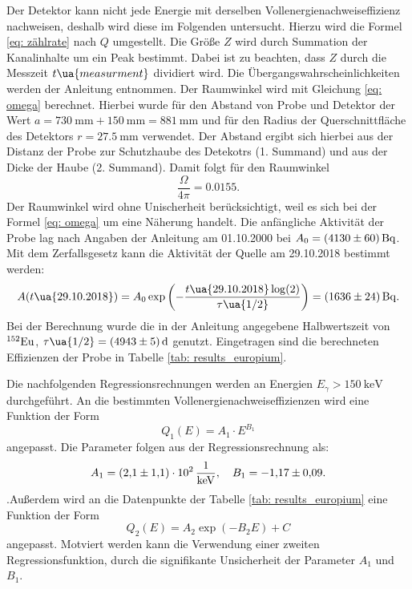\FloatBarrier
Der Detektor kann nicht jede Energie mit derselben Vollenergienachweiseffizienz
nachweisen, deshalb wird diese im Folgenden untersucht. Hierzu wird die Formel
\eqref{eq: zählrate} nach $Q$ umgestellt. Die Größe $Z$ wird durch Summation der Kanalinhalte
um ein Peak bestimmt. Dabei ist zu beachten, dass $Z$ durch die Messzeit $t\ua{measurment}$
dividiert wird. Die Übergangswahrscheinlichkeiten werden der Anleitung \cite{anleitungv18}
entnommen. Der Raumwinkel wird mit Gleichung \eqref{eq: omega} berechnet. Hierbei wurde
für den Abstand von Probe und Detektor der Wert $a=\SI{730}{\milli\meter}+\SI{150}{\milli\meter}=\SI{881}{\milli\meter}$ und für
den Radius der Querschnittfläche des Detektors $r=\SI{27.5}{\milli\meter}$
verwendet. Der Abstand ergibt sich hierbei aus der Distanz der Probe zur
Schutzhaube des Detekotrs (1. Summand) und aus der Dicke der Haube (2. Summand).
Damit folgt für den Raumwinkel
\begin{equation}
  \label{eq:winkelverteilung}
  \frac{\Omega}{4\pi}=\num{0.0155}.
\end{equation}
Der Raumwinkel wird ohne Unischerheit berücksichtigt, weil es sich bei der Formel
\eqref{eq: omega} um eine Näherung handelt.
Die anfängliche Aktivität der Probe lag nach Angaben der Anleitung \cite{anleitungv18}
am 01.10.2000 bei $A_0=\SI{4130\pm60}{\becquerel}$. Mit dem Zerfallsgesetz kann die
Aktivität der Quelle am 29.10.2018 bestimmt werden:
\begin{equation}
  A(t\ua{29.10.2018})=A_0\exp\left(-\frac{t\ua{29.10.2018}\log(2)}{\tau\ua{1/2}}\right) = \SI{1636\pm24}{\becquerel}.
\end{equation}
Bei der Berechnung wurde die in der Anleitung \cite{anleitungv18} angegebene
Halbwertszeit von $^{152}\ce{Eu}$, $\tau\ua{1/2}=\SI{4943 \pm 5 }{\day}$ genutzt.
Eingetragen sind die berechneten Effizienzen der Probe in Tabelle \ref{tab: results_europium}.

Die nachfolgenden Regressionsrechnungen werden an Energien $E_\gamma>\SI{150}{\kilo\eV}$
durchgeführt.
An die bestimmten Vollenergienachweiseffizienzen wird eine Funktion der Form
\begin{equation*}
  Q_1(E)=A_1\cdot E^{B_1}
\end{equation*}
angepasst. Die Parameter folgen aus der Regressionsrechnung als:
\begin{equation}
\label{eq:effizienz_Q_1}
A_1 = \SI{2.1\pm1.1 e2}{\per\kilo\eV}, \quad B_1=\num{-1.17\pm 0.09}.
\end{equation}
.Außerdem wird an die Datenpunkte der Tabelle \ref{tab: results_europium}
eine Funktion der Form
\begin{equation*}
  Q_2(E)=A_2\exp\left(-B_2 E\right)+C
\end{equation*}
angepasst. Motviert werden kann die Verwendung einer zweiten Regressionsfunktion, durch
die signifikante Unsicherheit der Parameter $A_1$ und $B_1$.

